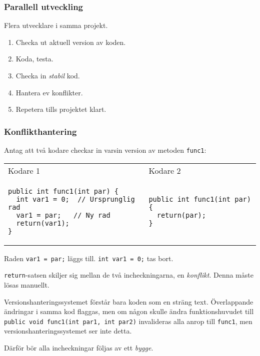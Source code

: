 \documentclass[swedish]{beamer}
\begin{document}
\begin{frame}
\frametitle{Parallell utveckling}

Flera utvecklare i samma projekt.
\begin{enumerate}
\item Checka ut aktuell version av koden.
\item Koda, testa.
\item Checka in \emph{stabil} kod.
\item Hantera ev konflikter.
\item Repetera tills projektet klart.
\end{enumerate}
\end{frame}

\begin{frame}[fragile]
  \frametitle{Konflikthantering}
Antag att två kodare checkar in varsin version av metoden \lstinline+func1+:
\begin{tabular}{ll}
Kodare 1&Kodare 2\\
\begin{minipage}[t]{0.45\linewidth}
\begin{lstlisting}[basicstyle=\tiny]
public int func1(int par) {
  int var1 = 0;  // Ursprunglig rad
  var1 = par;   // Ny rad
  return(var1);
}
\end{lstlisting}
\end{minipage}
&
\begin{minipage}[t]{0.45\linewidth}
\begin{lstlisting}[basicstyle=\tiny]
public int func1(int par) {
  return(par);
}
\end{lstlisting}
\end{minipage}
\end{tabular}
\end{frame}

\begin{frame}[fragile]
Raden \lstinline+var1 = par;+ läggs till.
\lstinline+int var1 = 0;+ tas
bort.  

\lstinline+return+-satsen skiljer sig mellan de två incheckningarna, en \emph{konflikt}.  Denna måste lösas manuellt.

\end{frame}

\begin{frame}[fragile]
Versionshanteringssystemet förstår bara koden som en sträng text.
Överlappande ändringar i samma kod flaggas, men om någon skulle ändra
funktionshuvudet till \lstinline+public void func1(int par1, int
par2)+ invalideras alla anrop till \lstinline+func1+, men
versionshanteringssystemet ser inte detta.

Därför bör alla incheckningar följas av ett \emph{bygge}.
\end{frame}
\end{document}
